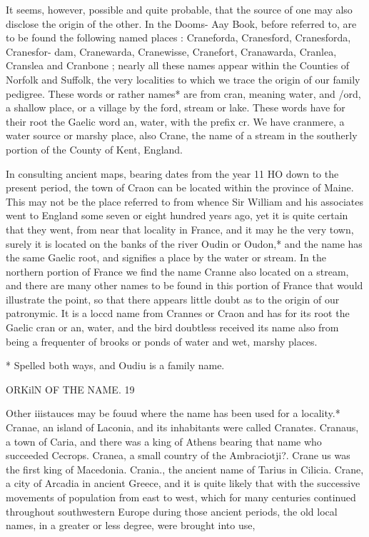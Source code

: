 \documentclass{book}
\begin{document}
It seems, however, possible and quite probable, that the source 
of one may also disclose the origin of the other. In the Dooms- 
Aay Book, before referred to, are to be found the following 
named places : Craneforda, Cranesford, Cranesforda, Cranesfor- 
dam, Cranewarda, Cranewisse, Cranefort, Cranawarda, Cranlea, 
Cranslea and Cranbone ; nearly all these names appear within the 
Counties of Norfolk and Suffolk, the very localities to which we 
trace the origin of our family pedigree. These words or rather 
names* are from cran, meaning water, and /ord, a shallow place, 
or a village by the ford, stream or lake. These words have for 
their root the Gaelic word an, water, with the prefix cr. We 
have cranmere, a water source or marshy place, also Crane, the 
name of a stream in the southerly portion of the County of Kent, 
England. 

In consulting ancient maps, bearing dates from the year 11 HO 
down to the present period, the town of Craon can be located 
within the province of Maine. This may not be the place referred 
to from whence Sir William and his associates went to England 
some seven or eight hundred years ago, yet it is quite certain that 
they went, from near that locality in France, and it may he the 
very town, surely it is located on the banks of the river Oudin or 
Oudon,* and the name has the same Gaelic root, and signifies a 
place by the water or stream. In the northern portion of France 
we find the name Cranne also located on a stream, and there are 
many other names to be found in this portion of France that 
would illustrate the point, so that there appears little doubt as to 
the origin of our patronymic. It is a loccd name from Crannes 
or Craon and has for its root the Gaelic cran or an, water, and 
the bird doubtless received its name also from being a frequenter 
of brooks or ponds of water and wet, marshy places. 

* Spelled both ways, and Oudiu is a family name. 



ORKilN OF THE NAME. 19 

Other iiistauces may be fouud where the name has been used 
for a locality.* Cranae, an island of Laconia, and its inhabitants 
were called Cranates. Cranaus, a town of Caria, and there was 
a king of Athens bearing that name who succeeded Cecrops. 
Cranea, a small country of the Ambraciotji?. Crane us was the 
first king of Macedonia. Crania., the ancient name of Tarius in 
Cilicia. Crane, a city of Arcadia in ancient Greece, and it is 
quite likely that with the successive movements of population 
from east to west, which for many centuries continued throughout 
southwestern Europe during those ancient periods, the old local 
names, in a greater or less degree, were brought into use, 
\end{document}
